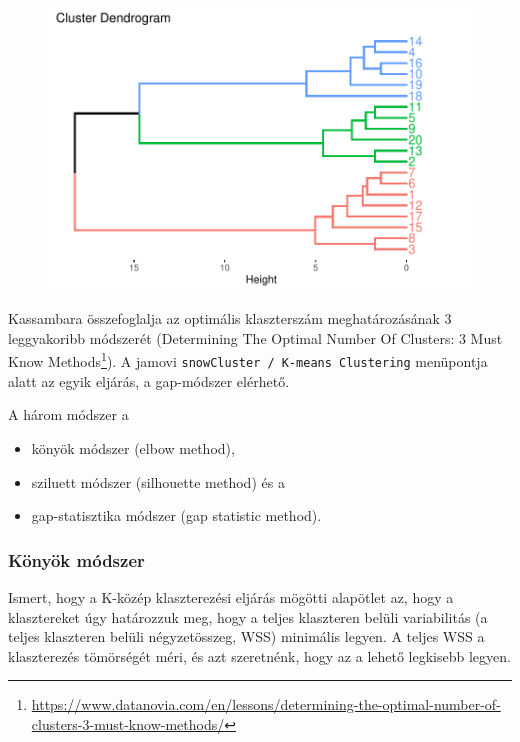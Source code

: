 \documentclass[
  letterpaper,
]{krantz}
\providecommand{\tightlist}{%
  \setlength{\itemsep}{0pt}\setlength{\parskip}{0pt}}\usepackage{longtable,booktabs,array}
\renewcommand{\href}[2]{#2\footnote{\url{#1}}}
\begin{document}
\begin{figure}[H]

{\centering \includegraphics{./sec_klaszter_files/figure-pdf/unnamed-chunk-8-1.pdf}

}

\end{figure}

Kassambara összefoglalja az optimális klaszterszám meghatározásának 3
leggyakoribb módszerét
(\href{https://www.datanovia.com/en/lessons/determining-the-optimal-number-of-clusters-3-must-know-methods/}{Determining
The Optimal Number Of Clusters: 3 Must Know Methods}). A jamovi
\texttt{snowCluster\ /\ K-means\ Clustering} menüpontja alatt az egyik
eljárás, a gap-módszer elérhető.

A három módszer a

\begin{itemize}
\tightlist
\item
  könyök módszer (elbow method),
\item
  sziluett módszer (silhouette method) és a
\item
  gap-statisztika módszer (gap statistic method).
\end{itemize}

\hypertarget{kuxf6nyuxf6k-muxf3dszer}{%
\subsubsection{Könyök módszer}\label{kuxf6nyuxf6k-muxf3dszer}}

Ismert, hogy a K-közép klaszterezési eljárás mögötti alapötlet az, hogy
a klasztereket úgy határozzuk meg, hogy a teljes klaszteren belüli
variabilitás (a teljes klaszteren belüli négyzetösszeg, WSS) minimális
legyen. A teljes WSS a klaszterezés tömörségét méri, és azt szeretnénk,
hogy az a lehető legkisebb legyen.
\end{document}
